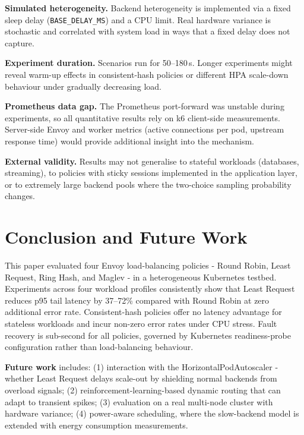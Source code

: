 \documentclass[conference]{IEEEtran}
\begin{document}
\textbf{Simulated heterogeneity.}
Backend heterogeneity is implemented via a fixed sleep delay
(\texttt{BASE\_DELAY\_MS}) and a CPU limit.
Real hardware variance is stochastic and correlated with system load in ways
that a fixed delay does not capture.

\textbf{Experiment duration.}
Scenarios run for 50--180\,s.
Longer experiments might reveal warm-up effects in consistent-hash policies or
different HPA scale-down behaviour under gradually decreasing load.

\textbf{Prometheus data gap.}
The Prometheus port-forward was unstable during experiments, so all quantitative
results rely on k6 client-side measurements.
Server-side Envoy and worker metrics (active connections per pod, upstream
response time) would provide additional insight into the mechanism.

\textbf{External validity.}
Results may not generalise to stateful workloads (databases, streaming), to
policies with sticky sessions implemented in the application layer, or to
extremely large backend pools where the two-choice sampling probability changes.

\section{Conclusion and Future Work}
\label{sec:conclusion}

This paper evaluated four Envoy load-balancing policies - Round Robin, Least
Request, Ring Hash, and Maglev - in a heterogeneous Kubernetes testbed.
Experiments across four workload profiles consistently show that Least Request
reduces p95 tail latency by 37--72\% compared with Round Robin at zero
additional error rate.
Consistent-hash policies offer no latency advantage for stateless workloads
and incur non-zero error rates under CPU stress.
Fault recovery is sub-second for all policies, governed by Kubernetes
readiness-probe configuration rather than load-balancing behaviour.

\textbf{Future work} includes:
(1) interaction with the HorizontalPodAutoscaler - whether Least Request delays
scale-out by shielding normal backends from overload signals;
(2) reinforcement-learning-based dynamic routing that can adapt to transient
spikes;
(3) evaluation on a real multi-node cluster with hardware variance;
(4) power-aware scheduling, where the slow-backend model is extended with
energy consumption measurements.





\end{document}
